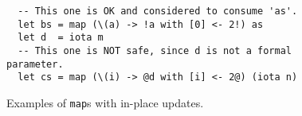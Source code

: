 \begin{figure}
\begin{lstlisting}
  -- This one is OK and considered to consume 'as'.
  let bs = map (\(a) -> !a with [0] <- 2!) as
  let d  = iota m
  -- This one is NOT safe, since d is not a formal parameter.
  let cs = map (\(i) -> @d with [i] <- 2@) (iota n)
\end{lstlisting}
  \caption{Examples of \lstinline{map}s with in-place updates.}
  \label{fig:map-in-place-update}
\end{figure}

